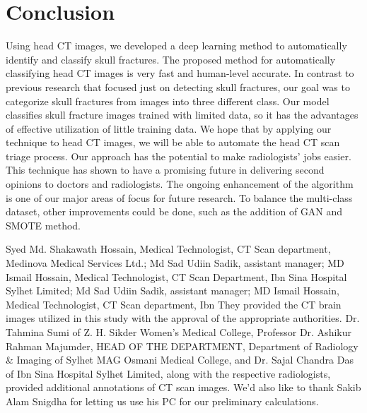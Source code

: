 \documentclass[sigconf]{acmart}
\begin{document}
\section{Conclusion}
Using head CT images, we developed a deep learning method to automatically identify and classify skull fractures. The proposed method for automatically classifying head CT images is very fast and human-level accurate. In contrast to previous research that focused just on detecting skull fractures, our goal was to categorize skull fractures from images into three different class. Our model classifies skull fracture images trained with limited data, so it has the advantages of effective utilization of little training data. We hope that by applying our technique to head CT images, we will be able to automate the head CT scan triage process. Our approach has the potential to make radiologists’ jobs easier. This technique has shown to have a promising future in delivering second opinions to doctors and radiologists. The ongoing enhancement of the algorithm is one of our major areas of focus for future research. To balance the multi-class dataset, other improvements could be done, such as the addition of GAN and SMOTE method.


\begin{acks}
	Syed Md. Shakawath Hossain, Medical Technologist, CT Scan department, Medinova Medical Services Ltd.; Md Sad Udiin Sadik, assistant manager; MD Ismail Hossain, Medical Technologist, CT Scan Department, Ibn Sina Hospital Sylhet Limited; Md Sad Udiin Sadik, assistant manager; MD Ismail Hossain, Medical Technologist, CT Scan department, Ibn They provided the CT brain images utilized in this study with the approval of the appropriate authorities. Dr. Tahmina Sumi of Z. H. Sikder Women's Medical College, Professor Dr. Ashikur Rahman Majumder, HEAD OF THE DEPARTMENT, Department of Radiology \& Imaging of Sylhet MAG Osmani Medical College, and Dr. Sajal Chandra Das of Ibn Sina Hospital Sylhet Limited, along with the respective radiologists, provided additional annotations of CT scan images. We'd also like to thank Sakib Alam Snigdha for letting us use his PC for our preliminary calculations.
\end{acks}




\appendix
\end{document}
